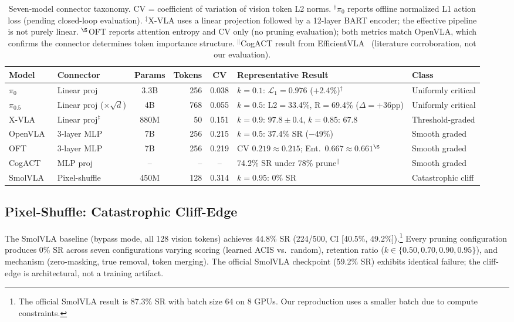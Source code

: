 \begin{table}[t]
\centering
\small
\caption{Seven-model connector taxonomy. CV = coefficient of variation of vision token L2 norms. $^\dagger\pi_0$ reports offline normalized L1 action loss (pending closed-loop evaluation). $^\ddagger$X-VLA uses a linear projection followed by a 12-layer BART encoder; the effective pipeline is not purely linear. $^\S$OFT reports attention entropy and CV only (no pruning evaluation); both metrics match OpenVLA, which confirms the connector determines token importance structure. $^\|$CogACT result from EfficientVLA~\cite{yang2025efficientvla} (literature corroboration, not our evaluation).}
\label{tab:taxonomy}
\begin{tabular}{llcrcll}
\toprule
Model & Connector & Params & Tokens & CV & Representative Result & Class \\
\midrule
$\pi_0$~\cite{black2024pi0} & Linear proj & 3.3B & 256 & 0.038 & $k{=}0.1$: $\mathcal{L}_1{=}0.976$ ($+$2.4\%)$^\dagger$ & Uniformly critical \\
$\pi_0.5$~\cite{black2025pi05} & Linear proj ($\times\!\sqrt{d}$) & 4B & 768 & 0.055 & $k{=}0.5$: L2$=$33.4\%, R$=$69.4\% ($\Delta{=}$+36pp) & Uniformly critical \\
X-VLA~\cite{zheng2025xvla} & Linear proj$^\ddagger$ & 880M & 50 & 0.151 & $k{=}0.9$: $97.8{\pm}0.4$, $k{=}0.85$: $67.8$ & Threshold-graded \\
OpenVLA~\cite{kim2024openvla} & 3-layer MLP & 7B & 256 & 0.215 & $k{=}0.5$: 37.4\% SR ($-$49\%) & Smooth graded \\
OFT~\cite{kim2025openoft} & 3-layer MLP & 7B & 256 & 0.219 & CV $0.219 \approx 0.215$; Ent.\ $0.667 \approx 0.661$$^\S$ & Smooth graded \\
CogACT~\cite{li2024cogact} & MLP proj & -- & -- & -- & 74.2\% SR under 78\% prune$^\|$ & Smooth graded \\
SmolVLA~\cite{shukor2025smolvla} & Pixel-shuffle & 450M & 128 & 0.314 & $k{=}0.95$: 0\% SR & Catastrophic cliff \\
\bottomrule
\end{tabular}
\end{table}

\subsection{Pixel-Shuffle: Catastrophic Cliff-Edge}
\label{sec:smolvla_results}

The SmolVLA baseline (bypass mode, all 128 vision tokens) achieves 44.8\% SR (224/500, CI [40.5\%, 49.2\%]).\footnote{The official SmolVLA result is 87.3\% SR with batch size 64 on 8 GPUs. Our reproduction uses a smaller batch due to compute constraints.} Every pruning configuration produces 0\% SR across seven configurations varying scoring (learned ACIS vs.\ random), retention ratio ($k \in \{0.50, 0.70, 0.90, 0.95\}$), and mechanism (zero-masking, true removal, token merging). The official SmolVLA checkpoint (59.2\% SR) exhibits identical failure; the cliff-edge is architectural, not a training artifact.

